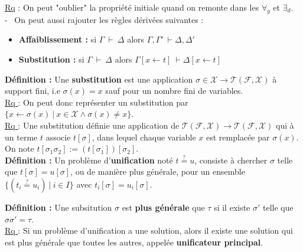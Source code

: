 \documentclass[11pt,a4paper]{article}
\begin{document}
\underline{Rq} : On peut "oublier" la propriété initiale quand on remonte dans les $\forall_g$ et $\exists_d$. \\

- \ On peut aussi rajouter les règles dérivées suivantes :
\begin{itemize}
\item \textbf{Affaiblissement :} si $\Gamma\ \vdash \ \Delta$ alors $\Gamma,\Gamma' \ \vdash \Delta,\Delta'$
\item \textbf{Substitution :} si $\Gamma\ \vdash \ \Delta$ alors $\Gamma[x \leftarrow t] \ \vdash \Delta[x \leftarrow t]$ \\
\end{itemize} 

\textbf{Définition :} Une \textbf{substitution} est une application $\sigma \in \mathcal{X} \rightarrow \mathcal{T}(\mathcal{F},\mathcal{X})$ à support fini, i.e $\sigma(x)=x$ sauf pour un nombre fini de variables. \\

\underline{Rq }: On peut donc représenter un substitution par $\{x \leftarrow \sigma(x) \ | \ x\in \mathcal{X} \land \sigma(x)\neq x \}$. \\

\underline{Rq }: Une substitution définie une application de $\mathcal{T}(\mathcal{F},\mathcal{X})       \rightarrow \mathcal{T}(\mathcal{F},\mathcal{X})$ qui à un terme $t$ associe $t[\sigma]$, dans lequel chaque variable $x$ est remplacée par $\sigma	(x)$. \\
On note $t[\sigma_1\sigma_2] := (t[\sigma_1])[\sigma_2]$. \\

\textbf{Définition :} Un problème d'\textbf{unification} noté $t \stackrel{?}{=} u$, consiste à chercher $\sigma$ telle que $t[\sigma]=u[\sigma]$, ou de manière plus générale, pour un ensemble $\{(t_i\stackrel{?}{=}u_i) \ | \ i \in I \}$ avec $t_i[\sigma]=u_i[\sigma]$.

\textbf{Définition :} Une subsitution $\sigma$ est \textbf{plus générale} que $\tau$ si il existe $\sigma'$ telle que $\sigma\sigma'=\tau$. \\

\underline{Rq }: Si un problème d'unification a une solution, alors il existe une solution qui est plus
générale que toutes les autres, appelée \textbf{unificateur principal}. \\
\end{document}
